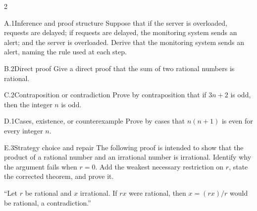 \documentclass[9pt]{extarticle}
\begin{document}
\begin{multicols}{2}
\begin{CoreProblem}{A.1}{Inference and proof structure}
Suppose that if the server is overloaded, requests are delayed; if requests are
delayed, the monitoring system sends an alert; and the server is overloaded.
Derive that the monitoring system sends an alert, naming the rule used at each
step.
\end{CoreProblem}
\begin{CoreProblem}{B.2}{Direct proof}
Give a direct proof that the sum of two rational numbers is rational.
\end{CoreProblem}
\begin{CoreProblem}{C.2}{Contraposition or contradiction}
Prove by contraposition that if $3n+2$ is odd, then the integer $n$ is odd.
\end{CoreProblem}
\columnbreak
\begin{CoreProblem}{D.1}{Cases, existence, or counterexample}
Prove by cases that $n(n+1)$ is even for every integer $n$.
\end{CoreProblem}
\begin{CoreProblem}{E.3}{Strategy choice and repair}
The following proof is intended to show that the product of a rational number
and an irrational number is irrational. Identify why the argument fails when
$r=0$. Add the weakest necessary restriction on $r$, state the corrected
theorem, and prove it.

``Let $r$ be rational and $x$ irrational. If $rx$ were rational, then $x=(rx)/r$ would be rational, a contradiction.''
\end{CoreProblem}
\end{multicols}
\CoreWorkArea
\FormBreak
{}
\end{document}
